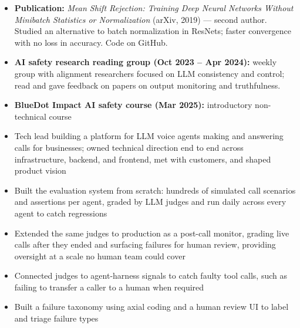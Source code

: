 \documentclass{my_cv}
\begin{document}
\begin{itemize}
\item \textbf{Publication:} \textit{Mean Shift Rejection: Training Deep Neural Networks Without Minibatch Statistics or Normalization} (arXiv, 2019) \href{https://arxiv.org/abs/1911.13173}{\faLink} --- second author. Studied an alternative to batch normalization in ResNets; faster convergence with no loss in accuracy. Code on GitHub.
\item \textbf{AI safety research reading group (Oct 2023 -- Apr 2024):} weekly group with alignment researchers focused on LLM consistency and control; read and gave feedback on papers on output monitoring and truthfulness.
\item \textbf{BlueDot Impact AI safety course (Mar 2025):} introductory non-technical course
\end{itemize}



\begin{itemize}
\item Tech lead building a platform for LLM voice agents making and answering calls for businesses; owned technical direction end to end across infrastructure, backend, and frontend, met with customers, and shaped product vision
\item Built the evaluation system from scratch: hundreds of simulated call scenarios and assertions per agent, graded by LLM judges and run daily across every agent to catch regressions
\item Extended the same judges to production as a post-call monitor, grading live calls after they ended and surfacing failures for human review, providing oversight at a scale no human team could cover
\item Connected judges to agent-harness signals to catch faulty tool calls, such as failing to transfer a caller to a human when required
\item Built a failure taxonomy using axial coding and a human review UI to label and triage failure types
\end{itemize}

\end{document}
